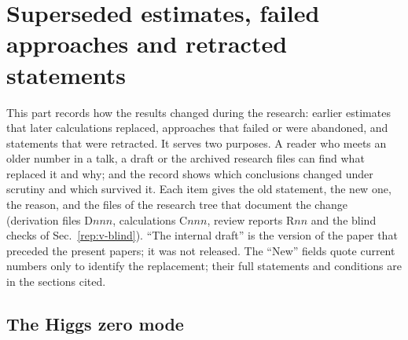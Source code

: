 
\newcommand{\rChist}[5]{\item[#1] \emph{Old:} #2\par\emph{New:} #3\par\emph{Reason:} #4\par\emph{Files:} {\small #5}}

\section{Superseded estimates, failed approaches and retracted statements}\label{rep:history}

\begin{center}
\end{center}

This part records how the results changed during the research: earlier estimates that later calculations replaced, approaches that failed or were abandoned, and statements that were retracted.
It serves two purposes.
A reader who meets an older number in a talk, a draft or the archived research files can find what replaced it and why; and the record shows which conclusions changed under scrutiny and which survived it.
Each item gives the old statement, the new one, the reason, and the files of the research tree that document the change (derivation files D$nnn$, calculations C$nnn$, review reports R$nn$ and the blind checks of Sec.~\ref{rep:v-blind}).
``The internal draft'' is the version of the paper that preceded the present papers; it was not released.
The ``New'' fields quote current numbers only to identify the replacement; their full statements and conditions are in the sections cited.

\subsection{The Higgs zero mode}\label{sec:v23-higgs}

